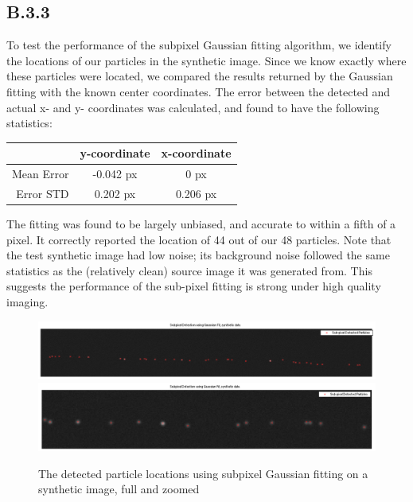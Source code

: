 \documentclass{article}
\begin{document}
\subsection*{B.3.3}

To test the performance of the subpixel Gaussian fitting algorithm, we identify the locations of our particles in the synthetic image. Since we know exactly where these particles were located, we compared the results returned by the Gaussian fitting with the known center coordinates. The error between the detected and actual x- and y- coordinates was calculated, and found to have the following statistics:

\begin{center}
\begin{tabular}{r | c | c}
               & y-coordinate & x-coordinate \\ \hline
    Mean Error & -0.042 px      & 0 px       \\
    Error STD  & 0.202 px       & 0.206 px
\end{tabular}
\end{center}

The fitting was found to be largely unbiased, and accurate to within a fifth of a pixel. It correctly reported the location of 44 out of our 48 particles. Note that the test synthetic image had low noise; its background noise followed the same statistics as the (relatively clean) source image it was generated from. This suggests the performance of the sub-pixel fitting is strong under high quality imaging.

\begin{figure}[H]
\centering
\includegraphics[width=16cm]{figures/subpixel_synthetic_full.png}
\includegraphics[width=16cm]{figures/subpixel_synthetic_zoom.png}
\caption{The detected particle locations using subpixel Gaussian fitting on a
    synthetic image, full and zoomed}
\label{fig:subpixelSynthetic}
\end{figure}
\end{document}
